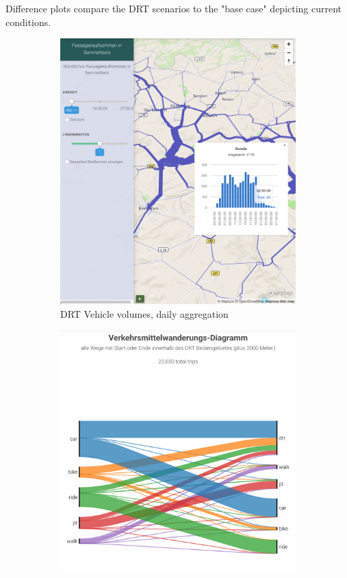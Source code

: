 \documentclass[3p,times,procedia]{elsarticle}
\begin{document}
Difference plots compare the DRT scenarios to the "base case" depicting current conditions.

\begin{figure}[ht]
  \centering
  \begin{subfigure}[c]{0.32\textwidth}
     \includegraphics[width=\linewidth]{images/fig-link-vols.png}
     \caption{DRT Vehicle volumes, daily aggregation }
     \label{fig:vehicles}
  \end{subfigure}
  \begin{subfigure}[c]{0.32\textwidth}
     \includegraphics[width=\linewidth]{images/fig-mode-share.png}

\end{subfigure}
\end{figure}
\end{document}
